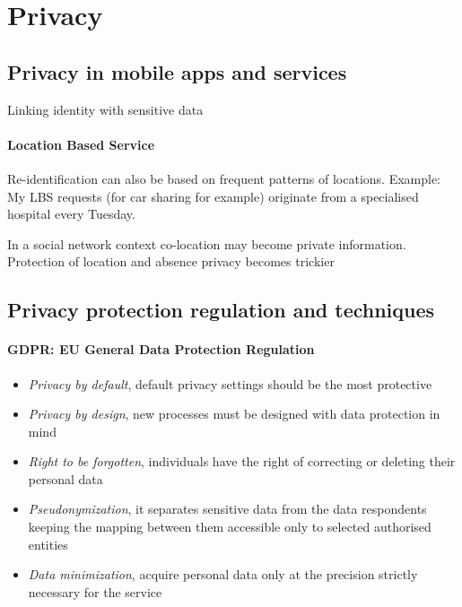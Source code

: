 \section{Privacy}

\subsection{Privacy in mobile apps and services}
Linking identity with sensitive data

\paragraph{Location Based Service}
Re-identification can also be based on frequent patterns of locations. Example: My LBS requests (for car sharing for example) originate from a specialised hospital every Tuesday. 

In a social network context co-location may become private information. Protection of location and absence privacy becomes trickier

\subsection{Privacy protection regulation and techniques}

\paragraph{GDPR: EU General Data Protection Regulation}
\begin{itemize}
    \item \textit{Privacy by default}, default privacy settings should be the most protective
    \item \textit{Privacy by design}, new processes must be designed with data protection in mind
    \item \textit{Right to be forgotten}, individuals have the right of correcting or deleting their personal data
    \item \textit{Pseudonymization}, it separates sensitive data from the data respondents keeping the mapping between them accessible only to selected authorised entities 
    \item \textit{Data minimization}, acquire personal data only at the precision strictly necessary for the service
\end{itemize}

